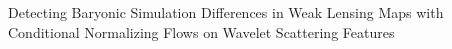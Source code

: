 \documentclass[]{article}
\begin{document}
Detecting Baryonic Simulation Differences in Weak Lensing Maps with Conditional Normalizing Flows on Wavelet Scattering Features
\end{document}
